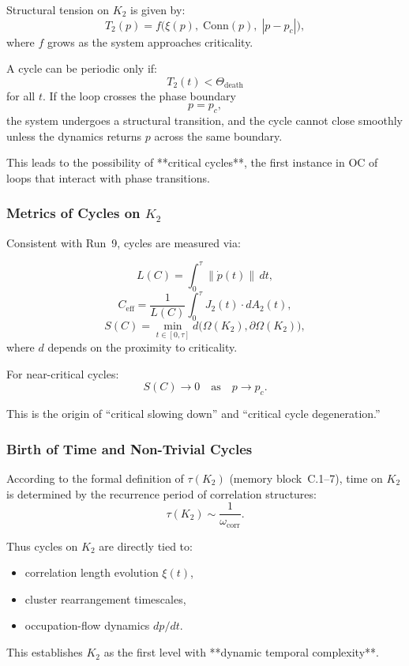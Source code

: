 Structural tension on $K_2$ is given by:
\[
  T_2(p)
  = f\bigl(\xi(p),\; \mathrm{Conn}(p),\;
       |p - p_c|\bigr),
\]
where $f$ grows as the system approaches criticality.

A cycle can be periodic only if:
\[
  T_2(t) < \Theta_{\mathrm{death}}
\]
for all $t$.
If the loop crosses the phase boundary
\[
  p = p_c,
\]
the system undergoes a structural transition, and the cycle cannot close
smoothly unless the dynamics returns $p$ across the same boundary.

This leads to the possibility of **critical cycles**, the first instance
in OC of loops that interact with phase transitions.

\subsubsection{Metrics of Cycles on \texorpdfstring{$K_2$}{K_2}}

Consistent with Run~9, cycles are measured via:

\[
  L(C)
  = \int_0^\tau \|\dot{p}(t)\|\, dt,
\]
\[
  C_{\mathrm{eff}}
  = \frac{1}{L(C)} \int_0^\tau J_2(t)\cdot dA_2(t),
\]
\[
  S(C) = \min_{t\in[0,\tau]} d\bigl(\Omega(K_2),\partial\Omega(K_2)\bigr),
\]
where $d$ depends on the proximity to criticality.

For near-critical cycles:
\[
  S(C) \to 0 \quad \text{as} \quad p\to p_c.
\]

This is the origin of ``critical slowing down'' and ``critical cycle
degeneration.''

\subsubsection{Birth of Time and Non-Trivial Cycles}

According to the formal definition of $\tau(K_2)$ (memory block~C.1–7),
time on $K_2$ is determined by the recurrence period of correlation
structures:
\[
  \tau(K_2) \sim \frac{1}{\omega_{\mathrm{corr}}}.
\]

Thus cycles on $K_2$ are directly tied to:

\begin{itemize}
  \item correlation length evolution $\xi(t)$,
  \item cluster rearrangement timescales,
  \item occupation-flow dynamics $dp/dt$.
\end{itemize}

This establishes $K_2$ as the first level with **dynamic temporal
complexity**.

